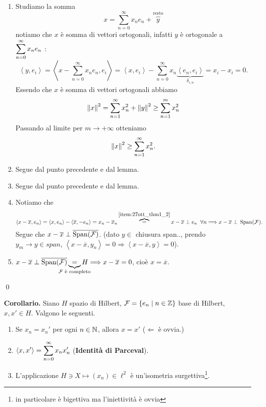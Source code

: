 \documentclass[a4paper, 12pt]{report}
\begin{document}
\begin{enumerate}
\item Studiamo la somma
%
$$
x = \sum_{n=0}^{\infty} x_n e_n + \overbrace{y}^{\text{resto}}
$$
%
notiamo che $x$ è somma di vettori ortogonali, infatti $y$ è ortogonale a $\displaystyle \sum_{n=0}^{\infty} x_n e_n$ :
%
$$
\left<y,e_i \right> = \left<x - \sum_{n=0}^{\infty} x_n e_n, e_i \right>
= \left<x,e_i \right> - \sum_{n=0}^{\infty} x_n \underbrace{\left<e_n,e_i \right>}_{\delta_{i,n}} = x_i - x_i = 0.
$$
%
Essendo che $x$ è somma di vettori ortogonali abbiamo
%
$$
\left\lVert x \right\rVert^2 = \sum_{n=1}^{\infty} x_n^2 + \left\lVert y \right\rVert^2 \geq \sum_{n=1}^{m} x_n^2  
$$
%
Passando al limite per $m \to +\infty$ otteniamo
%
$$
\left\lVert x \right\rVert^2 \geq \sum_{n=1}^{\infty} x_n^2. 
$$
%

\item Segue dal punto precedente e dal lemma.

\item Segue dal punto precedente e dal lemma.

\item Notiamo che 
%
$$
\left<x - \overline{x}, e_n \right> = \left<x,e_n \right> - \left<\overline{x} , -e_n \right> = x_n - \overline{x}_n 
\overbrace{=}^{\ref{item:27ott_thm1_2}} x - \overline{x} \; \bot \; e_n \;\; \forall n \Longrightarrow x - \overline{x} \; \bot \; \operatorname{Span}(\mathcal{F}).
$$
%
Segue che $x - \overline{x} \; \bot \; \overline{\operatorname{Span}(\mathcal{F})}$. (dato $y \in$ chiusura span.., prendo $y_m \to y \in span$, $\left< x- \overline{x}, y_n \right> = 0 \Rightarrow  \left<x - \overline{x}, y \right> = 0$).

\item $x - \overline{x} \ort \overline{\spn(\mathcal{F})} \underbrace{=}_{\mathclap{\text{$\mathcal{F}$ è completo}}} H \Longrightarrow x - \overline{x} = 0$, cioè $x = \overline{x}$.
\end{enumerate}
\qed

\textbf{Corollario.} Siano $H$ spazio di Hilbert, $\mathcal{F} = \left\{ e_n \;\middle|\; n \in \mathbb Z \right\}$ base di Hilbert, $x,x' \in H$. Valgono le seguenti.
\begin{enumerate}
\item Se $x_n = x_n'$ per ogni $n \in \mathbb N$, allora $x = x'$ ($\Leftarrow$ è ovvia.)

\item $\displaystyle \left<x,x' \right> = \sum_{n=0}^{\infty} x_n  x_n'$ (\textbf{Identità di Parceval}).

\item L'applicazione $H \ni X \mapsto (x_n) \in \ell^2$ è un'isometria surgettiva\footnote{in particolare è bigettiva ma l'iniettività è ovvia}.
\end{enumerate}
\end{document}

